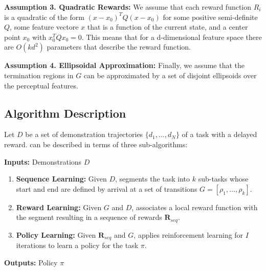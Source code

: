 \vspace{0.5em}\noindent\textbf{Assumption 3. Quadratic Rewards: } We assume that each reward function $R_i$ is a quadratic of the form $(x-x_0)^T Q (x - x_0)$ for some positive semi-definite $Q$, some feature vectore $x$ that is a function of the current state, and a center point $x_0$ with $x_0^T Q x_0 = 0$. This means that for a d-dimensional feature space there are $O(kd^2)$ parameters that describe the reward function.


\vspace{0.5em}\noindent\textbf{Assumption 4. Ellipsoidal Approximation: } Finally, we assume that the termination regions in $G$ can be approximated by a set of disjoint ellipsoids over the perceptual features.

\subsection{Algorithm Description}
Let $D$ be a set of demonstration trajectories $\{d_1,...,d_N\}$ of a task with a delayed reward.
\hirl can be described in terms of three sub-algorithms:

\vspace{2pt}
\noindent\textbf{Inputs:} Demonstrations $D$
\begin{enumerate}[
    topsep=0pt,
    noitemsep,
    leftmargin=*,
    ]
    \item \textbf{Sequence Learning: } Given $D$, \hirl segments the task into $k$ sub-tasks whose start and end are defined by arrival at a set of transitions $G = [\rho_1,...,\rho_k]$.
    \item \textbf{Reward Learning: } Given $G$ and $D$, \hirl associates a local reward function with the segment resulting in a sequence of rewards $\mathbf{R}_{seq}$. 
    \item \textbf{Policy Learning: } Given $\mathbf{R}_{seq}$ and $G$, \hirl applies reinforcement learning for $I$ iterations to learn a policy for the task $\pi$.
\end{enumerate}

\noindent\textbf{Outputs:} Policy $\pi$








